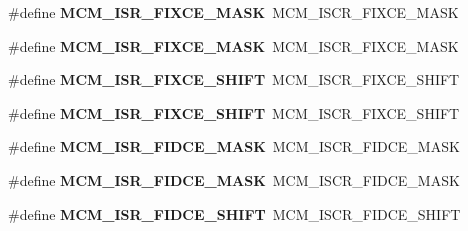\begin{DoxyCompactItemize}
\item 
\#define {\bfseries M\+C\+M\+\_\+\+I\+S\+R\+\_\+\+F\+I\+X\+C\+E\+\_\+\+M\+A\+SK}~M\+C\+M\+\_\+\+I\+S\+C\+R\+\_\+\+F\+I\+X\+C\+E\+\_\+\+M\+A\+SK\hypertarget{group__Backward__Compatibility__Symbols_ga91bb2a831a64c0915a1f7e798aaf1b3c}{}\label{group__Backward__Compatibility__Symbols_ga91bb2a831a64c0915a1f7e798aaf1b3c}

\item 
\#define {\bfseries M\+C\+M\+\_\+\+I\+S\+R\+\_\+\+F\+I\+X\+C\+E\+\_\+\+M\+A\+SK}~M\+C\+M\+\_\+\+I\+S\+C\+R\+\_\+\+F\+I\+X\+C\+E\+\_\+\+M\+A\+SK\hypertarget{group__Backward__Compatibility__Symbols_ga91bb2a831a64c0915a1f7e798aaf1b3c}{}\label{group__Backward__Compatibility__Symbols_ga91bb2a831a64c0915a1f7e798aaf1b3c}

\item 
\#define {\bfseries M\+C\+M\+\_\+\+I\+S\+R\+\_\+\+F\+I\+X\+C\+E\+\_\+\+S\+H\+I\+FT}~M\+C\+M\+\_\+\+I\+S\+C\+R\+\_\+\+F\+I\+X\+C\+E\+\_\+\+S\+H\+I\+FT\hypertarget{group__Backward__Compatibility__Symbols_ga77e3807fb3be264bbbcf2c8f788935e1}{}\label{group__Backward__Compatibility__Symbols_ga77e3807fb3be264bbbcf2c8f788935e1}

\item 
\#define {\bfseries M\+C\+M\+\_\+\+I\+S\+R\+\_\+\+F\+I\+X\+C\+E\+\_\+\+S\+H\+I\+FT}~M\+C\+M\+\_\+\+I\+S\+C\+R\+\_\+\+F\+I\+X\+C\+E\+\_\+\+S\+H\+I\+FT\hypertarget{group__Backward__Compatibility__Symbols_ga77e3807fb3be264bbbcf2c8f788935e1}{}\label{group__Backward__Compatibility__Symbols_ga77e3807fb3be264bbbcf2c8f788935e1}

\item 
\#define {\bfseries M\+C\+M\+\_\+\+I\+S\+R\+\_\+\+F\+I\+D\+C\+E\+\_\+\+M\+A\+SK}~M\+C\+M\+\_\+\+I\+S\+C\+R\+\_\+\+F\+I\+D\+C\+E\+\_\+\+M\+A\+SK\hypertarget{group__Backward__Compatibility__Symbols_ga4780723525e85d00fded39af33239306}{}\label{group__Backward__Compatibility__Symbols_ga4780723525e85d00fded39af33239306}

\item 
\#define {\bfseries M\+C\+M\+\_\+\+I\+S\+R\+\_\+\+F\+I\+D\+C\+E\+\_\+\+M\+A\+SK}~M\+C\+M\+\_\+\+I\+S\+C\+R\+\_\+\+F\+I\+D\+C\+E\+\_\+\+M\+A\+SK\hypertarget{group__Backward__Compatibility__Symbols_ga4780723525e85d00fded39af33239306}{}\label{group__Backward__Compatibility__Symbols_ga4780723525e85d00fded39af33239306}

\item 
\#define {\bfseries M\+C\+M\+\_\+\+I\+S\+R\+\_\+\+F\+I\+D\+C\+E\+\_\+\+S\+H\+I\+FT}~M\+C\+M\+\_\+\+I\+S\+C\+R\+\_\+\+F\+I\+D\+C\+E\+\_\+\+S\+H\+I\+FT\hypertarget{group__Backward__Compatibility__Symbols_ga09c2932c9c8be24db7eb56a1817ab097}{}\label{group__Backward__Compatibility__Symbols_ga09c2932c9c8be24db7eb56a1817ab097}


\end{DoxyCompactItemize}
